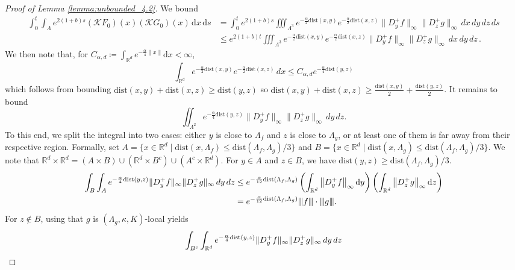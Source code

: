 \documentclass[10pt]{amsart}
\theoremstyle{definition}
\theoremstyle{remark}
\newcommand{\tnorm}[1]{{\left\vert\kern-0.25ex\left\vert\kern-0.25ex\left\vert #1 
		\right\vert\kern-0.25ex\right\vert\kern-0.25ex\right\vert}}
\newcommand{\dist}{\mathrm{dist}}
\newcommand{\R}{\mathbb{R}}
\newcommand{\region}{\Lambda}
\newcommand{\diff}{\mathrm{d}}
\newcommand{\norm}[1]{\left\lVert#1\right\rVert}
\begin{document}
\begin{proof}[Proof of Lemma \ref{lemma:unbounded_4.2}]
		
		We bound 
		\begin{align*}
			\int_0^t \int_\Lambda e^{2(1 + b)s} (\mathcal{K} F_0)(x) (\mathcal{K} G_0)(x) \,\diff x \,\diff s 
			&=  \int_0^t e^{2 (1+b) s} \iiint_{\Lambda^3}e^{-\frac{\alpha}{2}  \dist(x,y)}   e^{-\frac{\alpha}{2} \dist(x,z)}  \| D_y^+ f\|_\infty  \|D_z^+ g\|_\infty \,dx\,dy\,dz  \,ds \\
			&\leq e^{2 (1+b) t} \iiint_{\Lambda^3}e^{-\frac{\alpha}{2}  \dist(x,y)}   e^{-\frac{\alpha}{2}  \dist(x,z)}  \| D_y^+ f\|_\infty  \|D_z^+ g\|_\infty \,dx\,dy\,dz \,.
		\end{align*}
		We then note that, for $C_{\alpha, d} \coloneqq \int_{\R^d} e^{-\frac{\alpha}{4}  \norm{x}} \diff x < \infty$,
		\begin{equation}
			\int_{\R^d} e^{-\frac{\alpha}{2}  \dist(x,y)} e^{-\frac{\alpha}{2}  \dist(x,z)} \,dx \leq C_{\alpha, d}  e^{-\frac{\alpha}{4}  \dist(y,z)} 
		\end{equation} 
		which follows from bounding $\dist(x,y) + \dist(x,z) \geq \dist(y,z)$ so $\dist(x,y) + \dist(x,z) \geq \frac{\dist(x,y)}{2} + \frac{\dist(y,z)}{2}$. 
		It remains to bound $$\iint_{\region^2} e^{-\frac{\alpha}{4}  \dist(y,z)} \| D_y^+ f\|_\infty \|D_z^+ g\|_\infty \,dy\,dz.$$
		To this end, we split the integral into two cases: either $y$ is close to $\region_f$ and $z$ is close to $\region_g$, or at least one of them is far away from their respective region.
		Formally, set $A = \{x \in \R^d \mid \dist(x, \region_f) \le \dist(\region_f, \region_g)/3\}$ and $B = \{x \in \R^d \mid \dist(x, \region_g) \le \dist(\region_f, \region_g)/3\}$.
		We note that $\R^d \times \R^d = (A \times B) \cup (\R^d \times B^c) \cup (A^c \times \R^d)$. 
		For $y \in A$ and $z \in B$, we have $\dist(y, z) \ge \dist(\region_f, \region_g)/3$. 
		\begin{align}
			\int_B \int_A e^{-\frac{\alpha}{4} \dist(y, z)} \| D_y^+ f\|_\infty  \|D_z^+ g\|_\infty \,dy\,dz 
			&\leq e^{- \frac{\alpha}{12}  \dist(\region_f, \region_g)}  \left(\int_{\R^d}  \norm{D_y^+ f}_{\infty} \diff y\right)  \left(\int_{\R^d} \norm{D_z^+ g}_{\infty} \diff z\right) \notag \\
			&= e^{- \frac{\alpha}{12}  \dist(\region_f, \region_g)}  \tnorm{f} \cdot   \tnorm{g} . \label{eq:bound_close}
		\end{align}
		For $z \notin B$, using that $g$ is $(\region_g, \kappa, K)$-local yields
		\begin{align}
			\int_{B^c} \int_{\R^d} e^{-\frac{\alpha}{4}  \dist(y,z)} \| D_y^+ f\|_\infty \|D_z^+ g\|_\infty \,dy\,dz  \notag

\end{align}
\end{proof}
\end{document}
